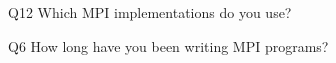 \begin{description}%
\item{Q12} Which MPI implementations do you use?%
\item{Q6} How long have you been writing MPI programs?%
\end{description}%
